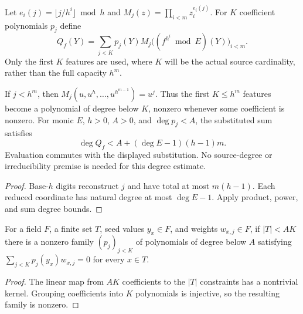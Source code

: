 \begin{definition}
  \label{def:lowerbounds-algebraic-condenser-monomials}
  \leanok
  Let $e_i(j)=\lfloor j/h^i\rfloor\bmod h$ and
  $M_j(z)=\prod_{i<m}z_i^{e_i(j)}$. For $K$ coefficient polynomials
  $p_j$ define
  \[
    Q_f(Y)=\sum_{j<K}p_j(Y)M_j\bigl((f^{h^i}\bmod E)(Y)\bigr)_{i<m}.
  \]
  Only the first $K$ features are used, where $K$ will be the actual
  source cardinality, rather than the full capacity $h^m$.
\end{definition}

\begin{theorem}
  \label{thm:lowerbounds-algebraic-condenser-monomials}
  \leanok
  If $j<h^m$, then $M_j(u,u^h,\ldots,u^{h^{m-1}})=u^j$.
  Thus the first $K\le h^m$ features become a polynomial of degree
  below $K$, nonzero whenever some coefficient is nonzero. For monic
  $E$, $h>0$, $A>0$, and $\deg p_j<A$, the substituted sum satisfies
  \[
    \deg Q_f<A+(\deg E-1)(h-1)m.
  \]
  Evaluation commutes with the displayed substitution. No source-degree
  or irreducibility premise is needed for this degree estimate.
\end{theorem}
\begin{proof}
  \leanok
  Base-$h$ digits reconstruct $j$ and have total at most $m(h-1)$.
  Each reduced coordinate has natural degree at most $\deg E-1$.
  Apply product, power, and sum degree bounds.
\end{proof}

\begin{theorem}
  \label{thm:lowerbounds-algebraic-condenser-interpolation}
  \leanok
  For a field $F$, a finite set $T$, seed values $y_x\in F$, and
  weights $w_{x,j}\in F$, if $|T|<AK$ there is a nonzero family
  $(p_j)_{j<K}$ of polynomials of degree below $A$ satisfying
  $\sum_{j<K}p_j(y_x)w_{x,j}=0$ for every $x\in T$.
\end{theorem}
\begin{proof}
  \leanok
  The linear map from $AK$ coefficients to the $|T|$ constraints
  has a nontrivial kernel. Grouping coefficients into $K$ polynomials
  is injective, so the resulting family is nonzero.
\end{proof}

